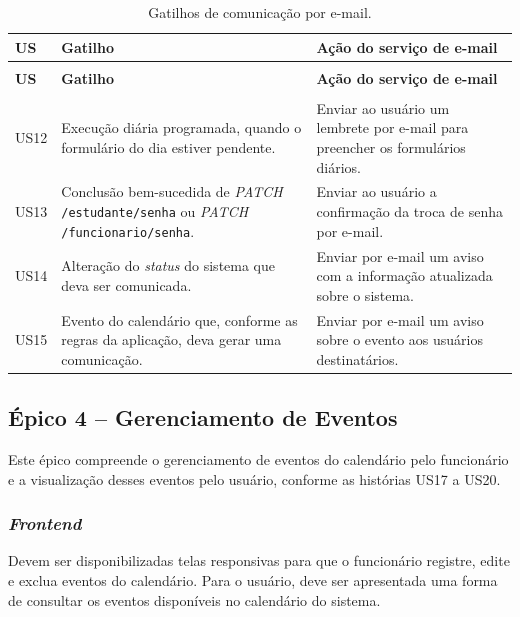 \renewcommand{\arraystretch}{1.5}
\setlength{\LTleft}{\fill}
\setlength{\LTright}{\fill}
\begin{longtable}{|>{\centering\arraybackslash}p{1.2cm}|>{\raggedright\arraybackslash}p{5.4cm}|>{\raggedright\arraybackslash}p{6.5cm}|}
\caption{Gatilhos de comunicação por e-mail.}\label{tab:gatilhos-comunicacao}\\
\hline
\textbf{US} & \textbf{Gatilho} & \textbf{Ação do serviço de e-mail} \\
\hline
\endfirsthead
\multicolumn{3}{c}{\tablename\ \thetable{} -- continuação}\\
\hline
\textbf{US} & \textbf{Gatilho} & \textbf{Ação do serviço de e-mail} \\
\hline
\endhead
\hline
\endfoot
\hline
\multicolumn{3}{c}{\small Fonte: autoria própria.}\\
\endlastfoot
US12 & Execução diária programada, quando o formulário do dia estiver pendente. & Enviar ao usuário um lembrete por e-mail para preencher os formulários diários. \\
\hline
US13 & Conclusão bem-sucedida de \textit{PATCH} \texttt{/estudante/\allowbreak senha} ou \textit{PATCH} \texttt{/funcionario/\allowbreak senha}. & Enviar ao usuário a confirmação da troca de senha por e-mail. \\
\hline
US14 & Alteração do \textit{status} do sistema que deva ser comunicada. & Enviar por e-mail um aviso com a informação atualizada sobre o sistema. \\
\hline
US15 & Evento do calendário que, conforme as regras da aplicação, deva gerar uma comunicação. & Enviar por e-mail um aviso sobre o evento aos usuários destinatários. \\
\hline
\end{longtable}

\subsection{Épico 4 -- Gerenciamento de Eventos}

Este épico compreende o gerenciamento de eventos do calendário pelo funcionário e a visualização desses eventos pelo usuário, conforme as histórias US17 a US20.

\subsubsection{\textit{Frontend}}

Devem ser disponibilizadas telas responsivas para que o funcionário registre, edite e exclua eventos do calendário. Para o usuário, deve ser apresentada uma forma de consultar os eventos disponíveis no calendário do sistema.

